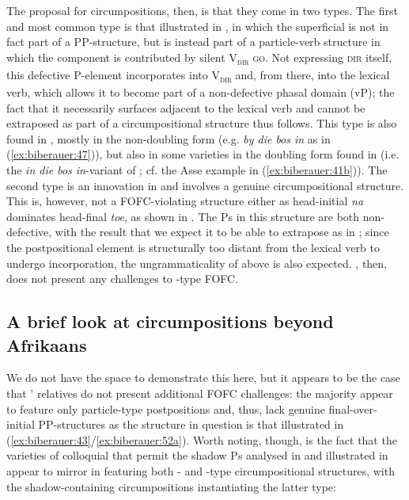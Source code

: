 \documentclass[output=paper]{LSP/langsci}
\begin{document}
The proposal for  circumpositions, then, is that they come in two types. The first and most common type is that illustrated in , in which the superficial  is not in fact part of a PP-structure, but is instead part of a particle-verb structure in which the  component is contributed by silent V\textsc{\textsubscript{dir}}\textsc{ go.} Not expressing \textsc{dir} itself, this defective P-element incorporates into V\textsc{\textsubscript{dir}} and, from there, into the lexical verb, which allows it to become part of a non-defective phasal domain (vP); the fact that it necessarily surfaces adjacent to the lexical verb and cannot be extraposed as part of a circumpositional structure thus follows. This type is also found in , mostly in the non-doubling form  (e.g. \textit{by die bos in} as in (\ref{ex:biberauer:47})), but also in some varieties in the doubling form found in  (i.e. the \textit{in die bos in}{}-variant of ; cf. the Asse  example in (\ref{ex:biberauer:41b})). The second type is an innovation in  and involves a genuine circumpositional structure. This is, however, not a FOFC-violating structure either as head-initial \textit{na} dominates head-final \textit{toe}, as shown in . The Ps in this structure are both non-defective, with the result that we expect it to be able to extrapose as in ; since the postpositional element is structurally too distant from the lexical verb to undergo incorporation, the ungrammaticality of  above is also expected. , then, does not present any challenges to -type FOFC. 


\subsection{A brief look at circumpositions beyond Afrikaans}


We do not have the space to demonstrate this here, but it appears to be the case that ’  relatives do not present additional FOFC challenges: the majority appear to feature only particle-type postpositions and, thus, lack genuine final-over-initial PP-structures as the structure in {question} is that illustrated in (\ref{ex:biberauer:43}\slash \ref{ex:biberauer:52a}). Worth noting, though, is the fact that the varieties of colloquial  that permit the shadow Ps analysed in \citet{Noonan2010} and illustrated in  appear to mirror  in featuring both - and -type circumpositional structures, with the shadow-containing circumpositions instantiating the latter type:
\end{document}

